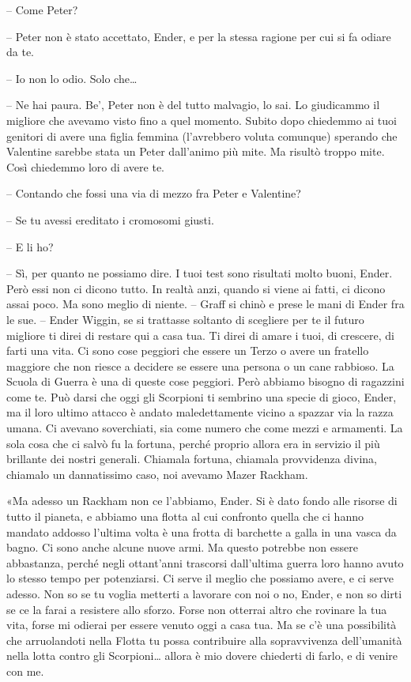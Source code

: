 {-- Come Peter?}

{-- Peter non è stato accettato, Ender, e per la stessa ragione per cui
	si fa odiare da te.}

{-- Io non lo odio. Solo che\ldots{}}

{-- Ne hai paura. Be', Peter non è del tutto malvagio, lo sai. Lo
	giudicammo il migliore che avevamo visto fino a quel momento. Subito
	dopo chiedemmo ai tuoi genitori di avere una figlia femmina (l'avrebbero
	voluta comunque) sperando che Valentine sarebbe stata un Peter
	dall'animo più mite. Ma risultò troppo mite. Così chiedemmo loro di
	avere te.}

{-- Contando che fossi una via di mezzo fra Peter e Valentine?}

{-- Se tu avessi ereditato i cromosomi giusti.}

{-- E li ho?}

{-- Sì, per quanto ne possiamo dire. I tuoi test sono risultati molto
	buoni, Ender. Però essi non ci dicono tutto. In realtà anzi, quando si
	viene ai fatti, ci dicono assai poco. Ma sono meglio di niente. -- Graff
	si chinò e prese le mani di Ender fra le sue. -- Ender Wiggin, se si
	trattasse soltanto di scegliere per te il futuro migliore ti direi di
	restare qui a casa tua. Ti direi di amare i tuoi, di crescere, di farti
	una vita. Ci sono cose peggiori che essere un Terzo o avere un fratello
	maggiore che non riesce a decidere se essere una persona o un cane
	rabbioso. La Scuola di Guerra è una di queste cose peggiori. Però
	abbiamo bisogno di ragazzini come te. Può darsi che oggi gli Scorpioni
	ti sembrino una specie di gioco, Ender, ma il loro ultimo attacco è
	andato maledettamente vicino a spazzar via la razza umana. Ci avevano
	soverchiati, sia come numero che come mezzi e armamenti. La sola cosa
	che ci salvò fu la fortuna, perché proprio allora era in servizio il più
	brillante dei nostri generali. Chiamala fortuna, chiamala provvidenza
	divina, chiamalo un dannatissimo caso, noi avevamo Mazer Rackham.}

{«Ma adesso un Rackham non ce l'abbiamo, Ender. Si è dato fondo alle
	risorse di tutto il pianeta, e abbiamo una flotta al cui confronto
	quella che ci hanno mandato addosso l'ultima volta è una frotta di
	barchette a galla in una vasca da bagno. Ci sono anche alcune nuove
	armi. Ma questo potrebbe non essere abbastanza, perché negli ottant'anni
	trascorsi dall'ultima guerra loro hanno avuto lo stesso tempo per
	potenziarsi. Ci serve il meglio che possiamo avere, e ci serve adesso.
	Non so se tu voglia metterti a lavorare con noi o no, Ender, e non so
	dirti se ce la farai a resistere allo sforzo. Forse non otterrai altro
	che rovinare la tua vita, forse mi odierai per essere venuto oggi a casa
	tua. Ma se c'è una possibilità che arruolandoti nella Flotta tu possa
	contribuire alla sopravvivenza dell'umanità nella lotta contro gli
	Scorpioni\ldots{} allora è mio dovere chiederti di farlo, e di venire
	con me.}

